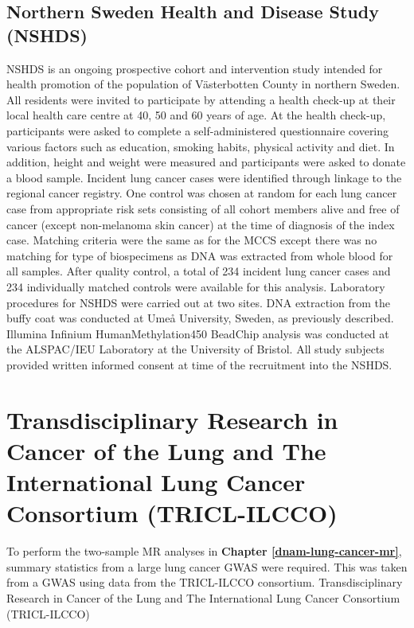 \documentclass[11pt,oneside]{bristolthesis}
\begin{document}
\hypertarget{nshds}{%
\subsection{Northern Sweden Health and Disease Study (NSHDS)}\label{nshds}}

NSHDS is an ongoing prospective cohort and intervention study intended for health promotion of the population of Västerbotten County in northern Sweden. All residents were invited to participate by attending a health check-up at their local health care centre at 40, 50 and 60 years of age. At the health check-up, participants were asked to complete a self-administered questionnaire covering various factors such as education, smoking habits, physical activity and diet. In addition, height and weight were measured and participants were asked to donate a blood sample. Incident lung cancer cases were identified through linkage to the regional cancer registry. One control was chosen at random for each lung cancer case from appropriate risk sets consisting of all cohort members alive and free of cancer (except non-melanoma skin cancer) at the time of diagnosis of the index case. Matching criteria were the same as for the MCCS except there was no matching for type of biospecimens as DNA was extracted from whole blood for all samples. After quality control, a total of 234 incident lung cancer cases and 234 individually matched controls were available for this analysis. Laboratory procedures for NSHDS were carried out at two sites. DNA extraction from the buffy coat was conducted at Umeå University, Sweden, as previously described. Illumina Infinium HumanMethylation450 BeadChip analysis was conducted at the ALSPAC/IEU Laboratory at the University of Bristol. All study subjects provided written informed consent at time of the recruitment into the NSHDS.

\hypertarget{tricl-ilcco-02}{%
\section{Transdisciplinary Research in Cancer of the Lung and The International Lung Cancer Consortium (TRICL-ILCCO)}\label{tricl-ilcco-02}}

To perform the two-sample MR analyses in \textbf{Chapter \ref{dnam-lung-cancer-mr}}, summary statistics from a large lung cancer GWAS were required. This was taken from a GWAS using data from the TRICL-ILCCO consortium. Transdisciplinary Research in Cancer of the Lung and The International Lung Cancer Consortium (TRICL-ILCCO)
\end{document}
